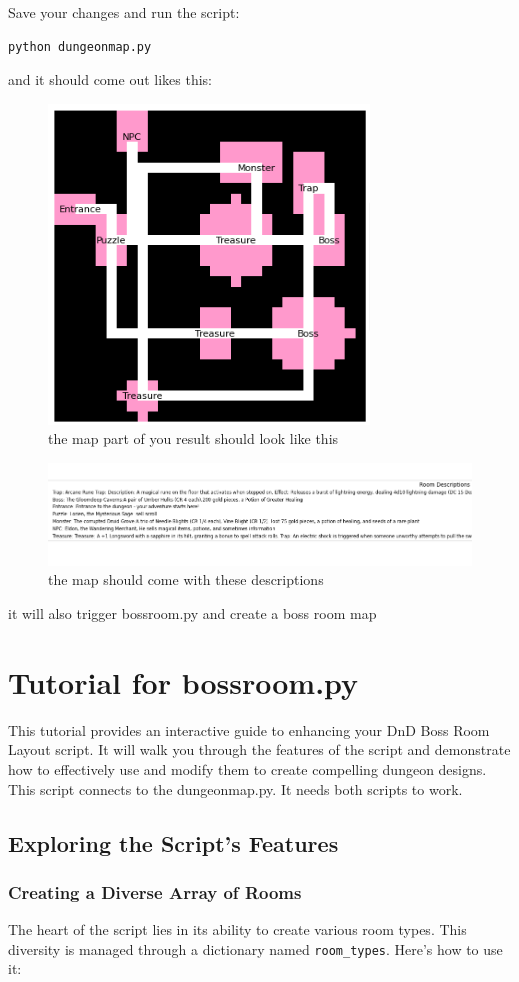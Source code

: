 \documentclass[10pt,twocolumn]{article}
\begin{document}
Save your changes and run the script:

\begin{lstlisting}[language=bash]
python dungeonmap.py
\end{lstlisting}
and it should come out likes this:
\begin{figure}
    \centering
    \includegraphics[width=0.5\linewidth]{example1.png}
    \caption{the map part of you result should look like this}
    \label{fig:enter-label}
\end{figure}

\begin{figure}
    \centering
    \includegraphics[width=0.5\linewidth]{decs.png}
    \caption{the map should come with these descriptions}
    \label{fig:enter-label}
\end{figure}
it will also trigger bossroom.py and create a boss room map
\section{Tutorial for bossroom.py}
This tutorial provides an interactive guide to enhancing your DnD Boss Room Layout script. It will walk you through the features of the script and demonstrate how to effectively use and modify them to create compelling dungeon designs. This script connects to the dungeonmap.py. It needs both scripts to work.

\subsection{Exploring the Script's Features}
\subsubsection{Creating a Diverse Array of Rooms}
The heart of the script lies in its ability to create various room types. This diversity is managed through a dictionary named \texttt{room\_types}. Here's how to use it:
\end{document}
